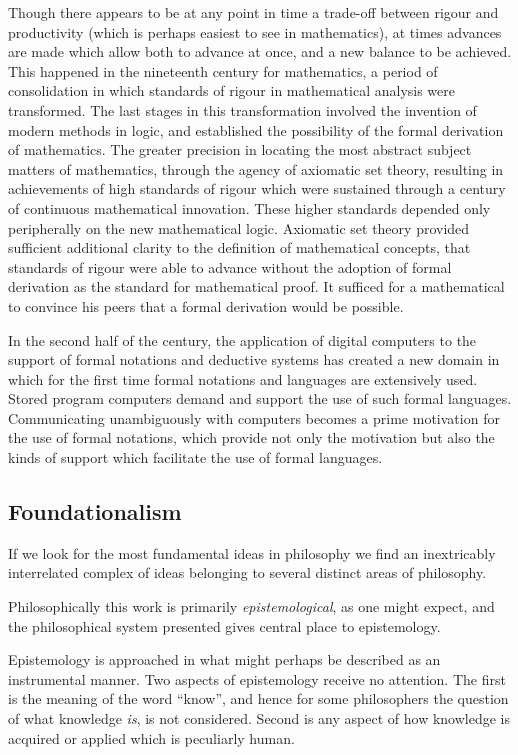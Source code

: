 Though there appears to be at any point in time a trade-off between
rigour and productivity (which is perhaps easiest to see in
mathematics), at times advances are made which allow both to advance
at once, and a new balance to be achieved.
This happened in the nineteenth century for mathematics, a period of
consolidation in which standards of rigour in mathematical analysis
were transformed.
The last stages in this transformation involved the invention of
modern methods in logic, and established the possibility of the formal
derivation of mathematics.
The greater precision in locating the most abstract subject matters of
mathematics, through the agency of axiomatic set theory, resulting in
achievements of high standards of rigour which were sustained through
a century of continuous mathematical innovation.
These higher standards depended only peripherally on the new
mathematical logic.
Axiomatic set theory provided sufficient additional clarity to the
definition of mathematical concepts, that standards of rigour were
able to advance without the adoption of formal derivation as the
standard for mathematical proof.
It sufficed for a mathematical to convince his peers that a formal
derivation would be possible.

In the second half of the century, the application of digital
computers to the support of formal notations and deductive systems has
created a new domain in which for the first time formal notations and
languages are extensively used.
Stored program computers demand and support the use of such formal
languages.
Communicating unambiguously with computers becomes a prime motivation
for the use of formal notations, which provide not only the motivation
but also the kinds of support which facilitate the use of formal languages.

\subsection{Foundationalism}

If we look for the most fundamental ideas in philosophy we find an
inextricably interrelated complex of ideas belonging to several
distinct areas of philosophy.

Philosophically this work is primarily \emph{epistemological}, as one
might expect, and the philosophical system presented gives central
place to epistemology. 

Epistemology is approached in what might perhaps be described as an
instrumental manner.
Two aspects of epistemology receive no attention.
The first is the meaning of the word ``know'', and hence for some
philosophers the question of what knowledge \emph{is}, is not
considered.
Second is any aspect of how knowledge is acquired or applied which is
peculiarly human.

